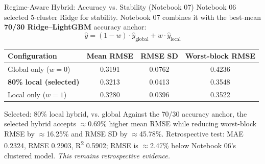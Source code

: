 \documentclass[11pt,aspectratio=169]{beamer}
\begin{document}
\begin{frame}{Regime-Aware Hybrid: Accuracy vs. Stability (Notebook 07)}
Notebook 06 selected 5-cluster Ridge for stability. Notebook 07 combines it with the best-mean \textbf{70/30 Ridge--LightGBM} accuracy anchor:
\[
\hat{y} = (1-w)\cdot \hat{y}_{\text{global}} + w \cdot \hat{y}_{\text{local}}
\]
\begin{center}
\scriptsize
\begin{tabular}{lccc}
\toprule
\textbf{Configuration} & \textbf{Mean RMSE} & \textbf{RMSE SD} & \textbf{Worst-block RMSE} \\
\midrule
Global only ($w{=}0$) & 0.3191 & 0.0762 & 0.4236 \\
\textbf{80\% local (selected)} & 0.3213 & 0.0413 & 0.3548 \\
Local only ($w{=}1$) & 0.3280 & 0.0396 & 0.3522 \\
\bottomrule
\end{tabular}
\end{center}
\begin{block}{Selected: 80\% local hybrid, vs. global}
\small Against the 70/30 accuracy anchor, the selected hybrid accepts $\approx$0.69\% higher mean RMSE while reducing worst-block RMSE by $\approx$16.25\% and RMSE SD by $\approx$45.78\%. Retrospective test: MAE 0.2324, RMSE 0.2903, R\textsuperscript{2} 0.5902; RMSE is $\approx$2.47\% below Notebook 06's clustered model. \emph{This remains retrospective evidence.}
\end{block}
\end{frame}
\end{document}
